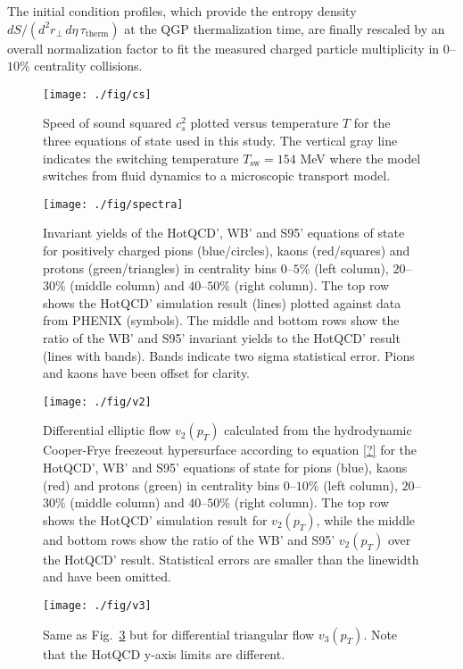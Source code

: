 \documentclass[aps,prc,reprint,amsmath,nofootinbib,superscriptaddress]{revtex4-1}
\begin{document}
The initial condition profiles, which provide the entropy density $dS/(d^2r_\perp\, d\eta\, \tau_\text{therm})$ at the QGP thermalization time, are finally 
rescaled by an overall normalization factor to fit the measured charged particle multiplicity in $0$--$10\%$ centrality collisions.

\begin{figure}
  \texttt{[image: ./fig/cs]}
  \caption{\label{fig:cs} Speed of sound squared $c_s^2$ plotted versus temperature $T$ for the three equations of state used in this study. The vertical
	   gray line indicates the switching temperature $T_\text{sw} = 154$ MeV where the model switches from fluid dynamics to a microscopic transport model.}
\end{figure}

\begin{figure*}[t]
  \texttt{[image: ./fig/spectra]}
  \caption{
    \label{fig:spectra} Invariant yields of the HotQCD', WB' and S95' equations of state for positively charged pions (blue/circles), kaons (red/squares) and 
    protons (green/triangles) in centrality bins $0$--$5$\% (left column), $20$--$30$\% (middle column) and $40$--$50$\% (right column). The top row shows the 
    HotQCD' simulation result (lines) plotted against data from PHENIX (symbols). The middle and bottom rows show the ratio of the WB' and S95' invariant yields 
    to the HotQCD' result (lines with bands). Bands indicate two sigma statistical error. Pions and kaons have been offset for clarity.
  }
\end{figure*}

\begin{figure*}[t]
  \texttt{[image: ./fig/v2]}
  \caption{
    \label{fig:v2} Differential elliptic flow $v_2(p_T)$ calculated from the hydrodynamic Cooper-Frye freezeout hypersurface according to equation \ref{?} for 
    the HotQCD', WB' and S95' equations of state for pions (blue), kaons (red) and protons (green) in centrality bins $0$--$10\%$ (left column), $20$--$30\%$ (middle column)
    and $40$--$50\%$ (right column). The top row shows the HotQCD' simulation result for $v_2(p_T)$, while the middle and bottom rows show the ratio of the WB' and
    S95' $v_2(p_T)$ over the HotQCD' result. Statistical errors are smaller than the linewidth and have been omitted.
  }
\end{figure*}

\begin{figure*}[t]
  \texttt{[image: ./fig/v3]}
  \caption{
    \label{fig:v3} Same as Fig.~\ref{fig:v2} but for differential triangular flow $v_3(p_T)$. Note that the HotQCD y-axis limits are different.
  }
\end{figure*}
\end{document}
